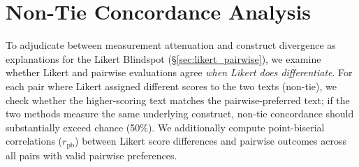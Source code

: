 \section{Non-Tie Concordance Analysis}
\label{app:concordance}

To adjudicate between measurement attenuation and construct divergence as explanations for the Likert Blindspot (\S\ref{sec:likert_pairwise}), we examine whether Likert and pairwise evaluations agree \emph{when Likert does differentiate}.
For each pair where Likert assigned different scores to the two texts (non-tie), we check whether the higher-scoring text matches the pairwise-preferred text; if the two methods measure the same underlying construct, non-tie concordance should substantially exceed chance (50\%).
We additionally compute point-biserial correlations ($r_{\text{pb}}$) between Likert score differences and pairwise outcomes across all pairs with valid pairwise preferences.

\begin{table}[h]
\centering
\small
\caption{Non-tie concordance between Likert and pairwise preferences. For each judge$\times$axis condition, we identify Likert non-tie pairs and check agreement with pairwise preference direction. Wilson 95\% CIs; $p$ from two-sided binomial test against 50\%. $r_{\text{pb}}$: point-biserial correlation between Likert score difference and pairwise outcome (all pairs with valid pairwise preference).}
\label{tab:concordance}
\end{table}

